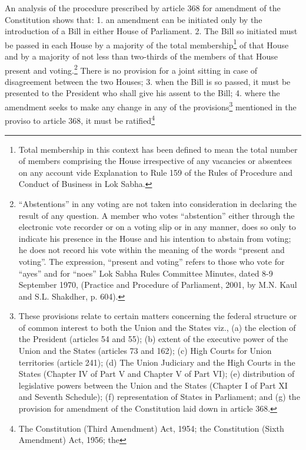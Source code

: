 \begin{multicols}{2}
\begin{enumerate}
\vspace{-.1cm}

\end{enumerate}

\vspace{-.4cm}

\noi
An analysis of the procedure prescribed by article 368 for amendment of the Constitution
shows that: 1. an amendment can be initiated only by the introduction of a Bill in either House
of Parliament. 2. The Bill so initiated must be passed in each House by a majority of the total
membership\footnote{Total membership in this context has been defined to mean the total number of members comprising the House irrespective of any vacancies or absentees on any account vide Explanation to Rule 159 of the Rules of Procedure
and Conduct of Business in Lok Sabha.} of that House and by a majority of not less than two-thirds of the members of
that House present and voting.\footnote{“Abstentions” in any voting are not taken into consideration in declaring the result of any question. A member who votes “abstention” either through the electronic vote recorder or on a voting slip or in any manner, does so only to indicate his presence in the House and his intention to abstain from voting; he does not record his vote
within the meaning of the words “present and voting”. The expression, “present and voting” refers to those who
vote for “ayes” and for “noes” Lok Sabha Rules Committee Minutes, dated 8-9 September 1970, (Practice and
Procedure of Parliament, 2001, by M.N. Kaul and S.L. Shakdher, p. 604).} There is no provision for a joint sitting in case of
disagreement between the two Houses; 3. when the Bill is so passed, it must be presented to
the President who shall give his assent to the Bill; 4. where the amendment seeks to make any
change in any of the provisions\footnote{These provisions relate to certain matters concerning the federal structure or of common interest to both the Union and the States viz., (a) the election of the President (articles 54 and 55); (b) extent of the executive power of the Union and the States (articles 73 and 162); (c) High Courts for Union territories (article 241); (d) The Union
Judiciary and the High Courts in the States (Chapter IV of Part V and Chapter V of Part VI); (e) distribution of
legislative powers between the Union and the States (Chapter I of Part XI and Seventh Schedule); (f)
representation of States in Parliament; and (g) the provision for amendment of the Constitution laid down in article
368.} mentioned in the proviso to article 368, it must be ratified\footnote{The Constitution (Third Amendment) Act, 1954; the Constitution (Sixth Amendment) Act, 1956; the
}
\end{multicols}
